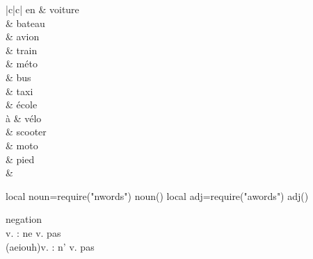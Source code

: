 \documentclass[./templates/main.tex]{subfiles}
\begin{document}
\begin{grammar}
  \begin{tblr}{|c|c|}
    \hline
        en & voiture \\
                           & bateau  \\
                           & avion   \\
                           & train   \\
                           & méto    \\
                           & bus     \\
                           & taxi    \\
                           & école   \\
    \hline
    à      & vélo    \\
                           & scooter \\
                           & moto    \\
                           & pied    \\
                           &
    \hline
  \end{tblr}
\end{grammar}
\begin{luacode*}
  local noun=require("nwords")
  noun()
  local adj=require("awords")
  adj()
\end{luacode*}
\begin{grammar}
  negation \\
  v. : ne v. pas \\
  (aeiouh)v. : n' v. pas
\end{grammar}
\end{document}
